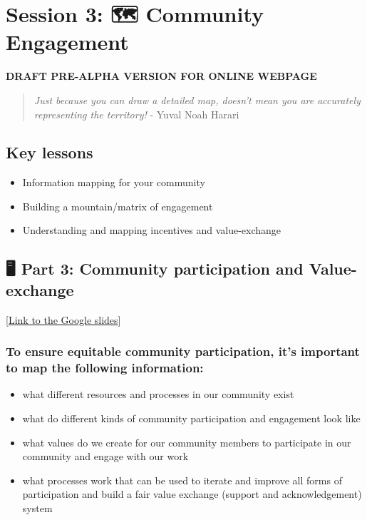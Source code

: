 \documentclass[
  letterpaper,
  DIV=11,
  numbers=noendperiod]{scrreport}
\providecommand{\tightlist}{%
  \setlength{\itemsep}{0pt}\setlength{\parskip}{0pt}}\usepackage{longtable,booktabs,array}
\begin{document}

\hypertarget{session-3-community-engagement}{%
\chapter{Session 3: 🗺 Community
Engagement}\label{session-3-community-engagement}}

\textbf{DRAFT PRE-ALPHA VERSION FOR ONLINE WEBPAGE}

\begin{quote}
\emph{Just because you can draw a detailed map, doesn't mean you are
accurately representing the territory!} - Yuval Noah Harari
\end{quote}

\hypertarget{key-lessons-2}{%
\section{Key lessons}\label{key-lessons-2}}

\begin{itemize}
\tightlist
\item
  Information mapping for your community
\item
  Building a mountain/matrix of engagement
\item
  Understanding and mapping incentives and value-exchange
\end{itemize}

\hypertarget{part-3-community-participation-and-value-exchange}{%
\section{🖥 Part 3: Community participation and
Value-exchange}\label{part-3-community-participation-and-value-exchange}}

{[}\href{https://docs.google.com/presentation/d/11LH1edg_0srL2ibTl2mVnsICIydtT0i2WC93TsjacsM/edit\#slide=id.g13faa93073d_0_1507}{Link
to the Google slides}{]}

\hypertarget{to-ensure-equitable-community-participation-its-important-to-map-the-following-information}{%
\subsection{To ensure equitable community participation, it's important
to map the following
information:}\label{to-ensure-equitable-community-participation-its-important-to-map-the-following-information}}

\begin{itemize}
\tightlist
\item
  what different resources and processes in our community exist
\item
  what do different kinds of community participation and engagement look
  like
\item
  what values do we create for our community members to participate in
  our community and engage with our work
\item
  what processes work that can be used to iterate and improve all forms
  of participation and build a fair value exchange (support and
  acknowledgement) system
\end{itemize}
\end{document}
